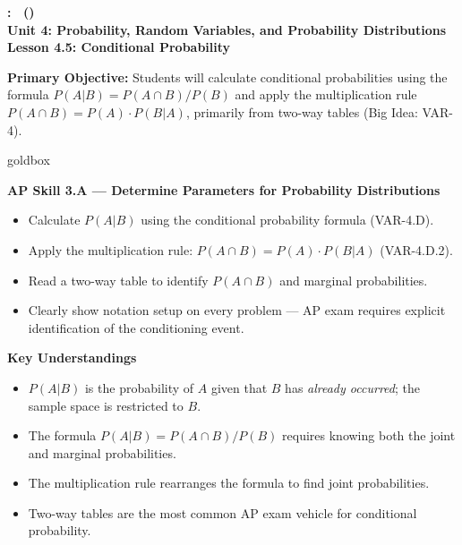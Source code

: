 \documentclass[10pt]{article}
\newcommand{\UnitNumberName}{Unit 4: Probability, Random Variables, and Probability Distributions \quad}
\newcommand{\LessonNumberName}{Lesson 4.5: Conditional Probability}
\begin{document}
\begin{center}
    {\Large\bfseries \CourseName: \SchoolYear\ (\MeetingLength) \\
    {\small\bfseries \UnitNumberName \LessonNumberName}}
\end{center}

\begin{tcolorbox}[colback=sky, colframe=navy, boxrule=0.9pt, arc=2mm,
    left=2mm, right=2mm, top=1.5mm, bottom=1.5mm]
    \textbf{Primary Objective:} Students will calculate conditional probabilities using
    the formula $P(A|B) = P(A \cap B)/P(B)$ and apply the multiplication rule
    $P(A \cap B) = P(A) \cdot P(B|A)$, primarily from two-way tables (Big Idea: VAR-4).
\end{tcolorbox}

\renewcommand{\arraystretch}{1.6}
\begin{skillbox}{goldbox}
\begin{minipage}[t]{0.48\linewidth}
    \textbf{AP Skill 3.A --- Determine Parameters for Probability Distributions}
    \begin{itemize}
        \item Calculate $P(A|B)$ using the conditional probability formula (VAR-4.D).
        \item Apply the multiplication rule: $P(A \cap B) = P(A) \cdot P(B|A)$
              (VAR-4.D.2).
        \item Read a two-way table to identify $P(A \cap B)$ and marginal probabilities.
        \item Clearly show notation setup on every problem --- AP exam requires
              explicit identification of the conditioning event.
    \end{itemize}
\end{minipage}
\hfill
\begin{minipage}[t]{0.48\linewidth}
    \textbf{Key Understandings}
    \begin{itemize}
        \item $P(A|B)$ is the probability of $A$ given that $B$ has \emph{already occurred};
              the sample space is restricted to $B$.
        \item The formula $P(A|B) = P(A \cap B)/P(B)$ requires knowing both the joint
              and marginal probabilities.
        \item The multiplication rule rearranges the formula to find joint probabilities.
        \item Two-way tables are the most common AP exam vehicle for conditional probability.
    \end{itemize}
\end{minipage}
\end{skillbox}
\end{document}
